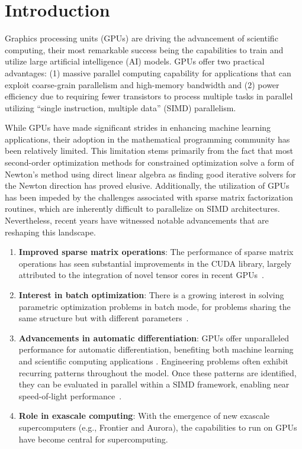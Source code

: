 \section{Introduction}
Graphics processing units (GPUs) are driving the advancement of scientific computing, their most remarkable success being the capabilities to train and utilize large artificial intelligence (AI) models.
GPUs offer two practical advantages: (1) massive parallel computing capability for applications that can exploit coarse-grain parallelism and high-memory bandwidth and (2) power efficiency due to requiring fewer transistors to process multiple tasks in parallel utilizing ``single instruction, multiple data'' (SIMD) parallelism.

While GPUs have made significant strides in enhancing machine learning applications, their adoption in the mathematical programming community has been relatively limited.
This limitation stems primarily from the fact that most second-order optimization methods for constrained optimization solve a form of Newton's method using direct linear algebra as finding good iterative solvers for the Newton direction has proved elusive. 
Additionally, the utilization of GPUs has been impeded by the challenges associated with sparse matrix factorization routines, which are inherently difficult to parallelize on SIMD architectures. Nevertheless, recent years have witnessed notable advancements that are reshaping this landscape.
\begin{enumerate}
  \item \textbf{Improved sparse matrix operations}: The performance of sparse matrix operations has seen substantial improvements in the CUDA library, largely attributed to the integration of novel tensor cores in recent GPUs~\cite{markidis2018nvidia}.
  \item \textbf{Interest in batch optimization}: There is a growing interest in solving parametric optimization problems in batch mode, for problems sharing the same structure but with different parameters~\cite{amos2017optnet,pineda2022theseus}.
  \item \textbf{Advancements in automatic differentiation}: GPUs offer unparalleled performance for automatic differentiation, benefiting both machine learning~\cite{jax2018github} and scientific computing applications \cite{enzyme2021}. Engineering problems often exhibit recurring patterns throughout the model. Once these patterns are identified, they can be evaluated in parallel within a SIMD framework, enabling near speed-of-light performance~\cite{shin2023accelerating}.
  \item \textbf{Role in exascale computing}: With the emergence of new exascale supercomputers (e.g., Frontier and Aurora), the capabilities to run on GPUs have become central for supercomputing.
\end{enumerate}

